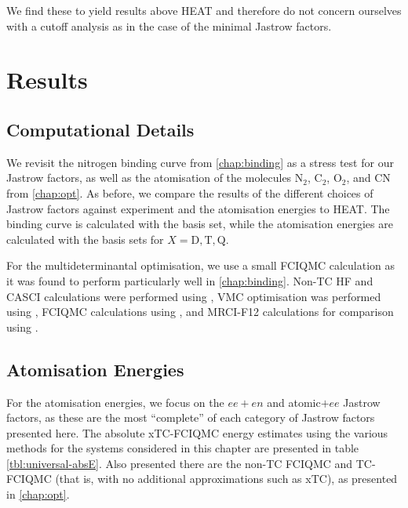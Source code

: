 We find these to yield results above HEAT and therefore do not concern ourselves with a cutoff analysis as in the case of the minimal Jastrow factors.

\section{Results}

\subsection{Computational Details}

We revisit the nitrogen binding curve from \autoref{chap:binding} as a stress test for our Jastrow factors, as well as the atomisation of the molecules N$_2$, C$_2$, O$_2$, and CN from \autoref{chap:opt}. As before, we compare the results of the different choices of Jastrow factors against experiment\supercite{leroyAccurate2006} and the atomisation energies to HEAT.\supercite{fellerSurvey2008} The binding curve is calculated with the \avtz basis set, while the atomisation energies are calculated with the  basis sets for $X=\text{D},\text{T},\text{Q}$.

For the multideterminantal optimisation, we use a small FCIQMC calculation as it was found to perform particularly well in \autoref{chap:binding}. Non-TC HF and CASCI calculations were performed using \pyscf,\supercite{sunPySCF2018} VMC optimisation was performed using \casino,\supercite{needsVariational2020} FCIQMC calculations using \neci,\supercite{gutherNECI2020} and MRCI-F12 calculations for comparison using \molpro.\supercite{wernerMOLPRO,wernerMolpro2012,wernerMolproQuantumChemistry2020}


\subsection{Atomisation Energies}
\label{sec:universal-atomisation}

For the atomisation energies, we focus on the $ee+en$ and atomic$+ee$ Jastrow factors, as these are the most ``complete'' of each category of Jastrow factors presented here. The absolute xTC-FCIQMC energy estimates using the various methods for the systems considered in this chapter are presented in table \ref{tbl:universal-absE}. Also presented there are the non-TC FCIQMC and TC-FCIQMC (that is, with no additional approximations such as xTC), as presented in \autoref{chap:opt}.

